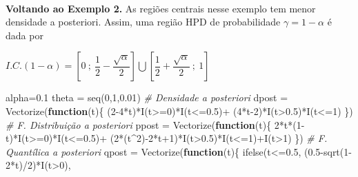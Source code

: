 \documentclass[
]{book}
\newenvironment{Shaded}{\begin{snugshade}}{\end{snugshade}}
\newcommand{\CommentTok}[1]{\textcolor[rgb]{0.56,0.35,0.01}{\textit{#1}}}
\newcommand{\ControlFlowTok}[1]{\textcolor[rgb]{0.13,0.29,0.53}{\textbf{#1}}}
\newcommand{\DecValTok}[1]{\textcolor[rgb]{0.00,0.00,0.81}{#1}}
\newcommand{\FloatTok}[1]{\textcolor[rgb]{0.00,0.00,0.81}{#1}}
\newcommand{\FunctionTok}[1]{\textcolor[rgb]{0.00,0.00,0.00}{#1}}
\newcommand{\NormalTok}[1]{#1}
\newcommand{\OtherTok}[1]{\textcolor[rgb]{0.56,0.35,0.01}{#1}}
\newcommand{\SpecialCharTok}[1]{\textcolor[rgb]{0.00,0.00,0.00}{#1}}
\begin{document}
\(~\)

\textbf{Voltando ao Exemplo 2.} As regiões centrais nesse exemplo tem menor densidade a posteriori. Assim, uma região HPD de probabilidade \(\gamma=1-\alpha\) é dada por

\(I.C.(1-\alpha)=\left[0~;~\dfrac{1}{2}-\dfrac{\sqrt{\alpha}}{2}\right]\bigcup \left[\dfrac{1}{2}+\dfrac{\sqrt{\alpha}}{2}~;~1\right]\)

\begin{Shaded}
\begin{Highlighting}[]
\NormalTok{alpha}\OtherTok{=}\FloatTok{0.1}
\NormalTok{theta }\OtherTok{=} \FunctionTok{seq}\NormalTok{(}\DecValTok{0}\NormalTok{,}\DecValTok{1}\NormalTok{,}\FloatTok{0.01}\NormalTok{)}
\CommentTok{\# Densidade a posteriori}
\NormalTok{dpost }\OtherTok{=} \FunctionTok{Vectorize}\NormalTok{(}\ControlFlowTok{function}\NormalTok{(t)\{ (}\DecValTok{2{-}4}\SpecialCharTok{*}\NormalTok{t)}\SpecialCharTok{*}\FunctionTok{I}\NormalTok{(t}\SpecialCharTok{\textgreater{}=}\DecValTok{0}\NormalTok{)}\SpecialCharTok{*}\FunctionTok{I}\NormalTok{(t}\SpecialCharTok{\textless{}=}\FloatTok{0.5}\NormalTok{)}\SpecialCharTok{+}
\NormalTok{    (}\DecValTok{4}\SpecialCharTok{*}\NormalTok{t}\DecValTok{{-}2}\NormalTok{)}\SpecialCharTok{*}\FunctionTok{I}\NormalTok{(t}\SpecialCharTok{\textgreater{}}\FloatTok{0.5}\NormalTok{)}\SpecialCharTok{*}\FunctionTok{I}\NormalTok{(t}\SpecialCharTok{\textless{}=}\DecValTok{1}\NormalTok{) \})}
\CommentTok{\# F. Distribuição a posteriori}
\NormalTok{ppost }\OtherTok{=} \FunctionTok{Vectorize}\NormalTok{(}\ControlFlowTok{function}\NormalTok{(t)\{ }\DecValTok{2}\SpecialCharTok{*}\NormalTok{t}\SpecialCharTok{*}\NormalTok{(}\DecValTok{1}\SpecialCharTok{{-}}\NormalTok{t)}\SpecialCharTok{*}\FunctionTok{I}\NormalTok{(t}\SpecialCharTok{\textgreater{}=}\DecValTok{0}\NormalTok{)}\SpecialCharTok{*}\FunctionTok{I}\NormalTok{(t}\SpecialCharTok{\textless{}=}\FloatTok{0.5}\NormalTok{)}\SpecialCharTok{+}
\NormalTok{    (}\DecValTok{2}\SpecialCharTok{*}\NormalTok{(t}\SpecialCharTok{\^{}}\DecValTok{2}\NormalTok{)}\SpecialCharTok{{-}}\DecValTok{2}\SpecialCharTok{*}\NormalTok{t}\SpecialCharTok{+}\DecValTok{1}\NormalTok{)}\SpecialCharTok{*}\FunctionTok{I}\NormalTok{(t}\SpecialCharTok{\textgreater{}}\FloatTok{0.5}\NormalTok{)}\SpecialCharTok{*}\FunctionTok{I}\NormalTok{(t}\SpecialCharTok{\textless{}=}\DecValTok{1}\NormalTok{)}\SpecialCharTok{+}\FunctionTok{I}\NormalTok{(t}\SpecialCharTok{\textgreater{}}\DecValTok{1}\NormalTok{) \})}
\CommentTok{\# F. Quantílica a posteriori}
\NormalTok{qpost }\OtherTok{=} \FunctionTok{Vectorize}\NormalTok{(}\ControlFlowTok{function}\NormalTok{(t)\{ }\FunctionTok{ifelse}\NormalTok{(t}\SpecialCharTok{\textless{}=}\FloatTok{0.5}\NormalTok{, (}\FloatTok{0.5}\SpecialCharTok{{-}}\FunctionTok{sqrt}\NormalTok{(}\DecValTok{1{-}2}\SpecialCharTok{*}\NormalTok{t)}\SpecialCharTok{/}\DecValTok{2}\NormalTok{)}\SpecialCharTok{*}\FunctionTok{I}\NormalTok{(t}\SpecialCharTok{\textgreater{}}\DecValTok{0}\NormalTok{),}

\end{Highlighting}
\end{Shaded}
\end{document}
